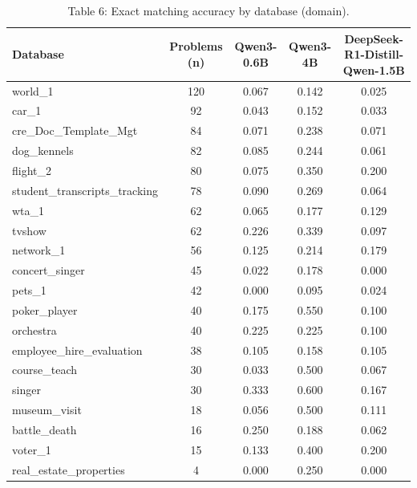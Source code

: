 \documentclass[11pt]{article}
\begin{document}
\begin{table}[H]
\centering
\footnotesize
\caption{Table 6: Exact matching accuracy by database (domain).}
\label{tab:db-exact}
\begin{tabular}{lcccc}
\toprule
Database & Problems (n) & Qwen3-0.6B & Qwen3-4B & DeepSeek-R1-Distill-Qwen-1.5B \\
\midrule
world\_1 & 120 & 0.067 & 0.142 & 0.025 \\
car\_1 & 92 & 0.043 & 0.152 & 0.033 \\
cre\_Doc\_Template\_Mgt & 84 & 0.071 & 0.238 & 0.071 \\
dog\_kennels & 82 & 0.085 & 0.244 & 0.061 \\
flight\_2 & 80 & 0.075 & 0.350 & 0.200 \\
student\_transcripts\_tracking & 78 & 0.090 & 0.269 & 0.064 \\
wta\_1 & 62 & 0.065 & 0.177 & 0.129 \\
tvshow & 62 & 0.226 & 0.339 & 0.097 \\
network\_1 & 56 & 0.125 & 0.214 & 0.179 \\
concert\_singer & 45 & 0.022 & 0.178 & 0.000 \\
pets\_1 & 42 & 0.000 & 0.095 & 0.024 \\
poker\_player & 40 & 0.175 & 0.550 & 0.100 \\
orchestra & 40 & 0.225 & 0.225 & 0.100 \\
employee\_hire\_evaluation & 38 & 0.105 & 0.158 & 0.105 \\
course\_teach & 30 & 0.033 & 0.500 & 0.067 \\
singer & 30 & 0.333 & 0.600 & 0.167 \\
museum\_visit & 18 & 0.056 & 0.500 & 0.111 \\
battle\_death & 16 & 0.250 & 0.188 & 0.062 \\
voter\_1 & 15 & 0.133 & 0.400 & 0.200 \\
real\_estate\_properties & 4 & 0.000 & 0.250 & 0.000 \\
\bottomrule
\end{tabular}
\end{table}
\end{document}
